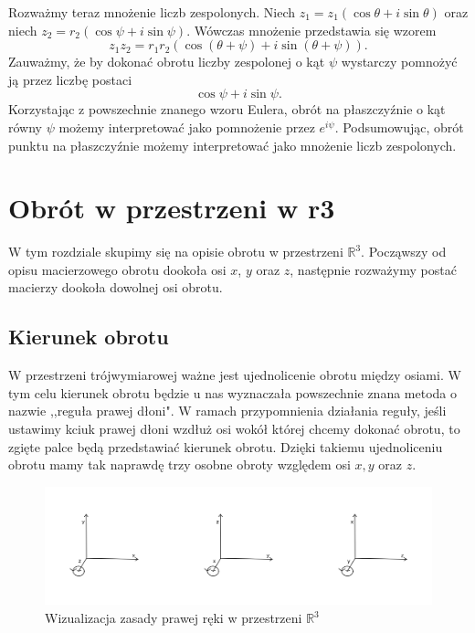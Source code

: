 \documentclass[a4paper,twoside,11pt,reqno]{mwrep}
\theoremstyle{plain} \newtheorem{twr}{Twierdzenie}
\theoremstyle{plain} \newtheorem{lem}{Lemat}
\theoremstyle{definition} \newtheorem{defi}{Definicja}
\theoremstyle{remark} \newtheorem*{wni}{Wniosek}
\theoremstyle{definition} \newtheorem{uwaga}{Uwaga}
\theoremstyle{definition}\newtheorem{prz}{Przykład}
\begin{document}
Rozważmy teraz mnożenie liczb zespolonych. Niech $z_1 = z_1(\cos\theta +i\sin\theta)$ oraz 
niech $z_2 = r_2(\cos\psi +i\sin\psi)$.
Wówczas mnożenie przedstawia się wzorem
$$z_1z_2=r_1r_2(\cos(\theta+\psi) +i\sin(\theta+\psi)).$$
Zauważmy, że by dokonać obrotu liczby zespolonej o kąt $\psi$ 
wystarczy pomnożyć ją przez liczbę postaci $$\cos\psi +i\sin\psi.$$
Korzystając z powszechnie znanego wzoru Eulera, obrót na płaszczyźnie
o kąt równy $\psi$ możemy interpretować jako pomnożenie przez $e^{i\psi}$.
Podsumowując, obrót punktu na płaszczyźnie możemy interpretować jako mnożenie liczb zespolonych.

\section{Obrót w przestrzeni w r3}

W tym rozdziale skupimy się na opisie obrotu w
przestrzeni $\mathbb{R}^3$. 
Począwszy od opisu macierzowego obrotu dookoła osi $x$, $y$ oraz $z$, następnie
rozważymy postać macierzy dookoła dowolnej osi obrotu.

\subsection{Kierunek obrotu}

W przestrzeni trójwymiarowej ważne jest ujednolicenie obrotu między osiami.
W tym celu kierunek obrotu będzie u nas wyznaczała powszechnie znana metoda
o nazwie ,,reguła prawej dłoni". W ramach przypomnienia działania reguły, jeśli ustawimy
kciuk prawej dłoni wzdłuż osi wokół której chcemy
dokonać obrotu, to zgięte palce będą przedstawiać kierunek obrotu.
Dzięki takiemu ujednoliceniu obrotu mamy tak naprawdę trzy osobne obroty względem osi $x,y$
oraz $z$.

\begin{figure}[h]
\begin{center}
\includegraphics[width=15 cm]{zasPrawejReki.png}
\caption{Wizualizacja zasady prawej ręki w przestrzeni $\mathbb{R}^3$}
\end{center}
\end{figure}
\end{document}
